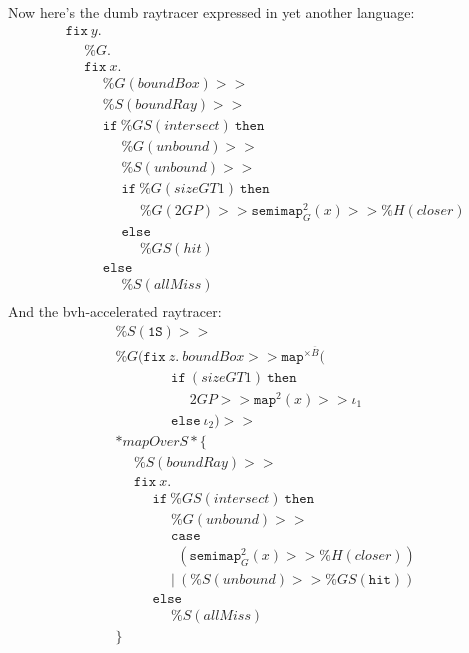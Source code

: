 \documentclass{article}
\newcommand {\fix}{\mathtt{fix}}
\newcommand {\isect}{\mathtt{hit}}
\newcommand {\oneS}{\mathtt{1S}}
\newcommand {\semimap}{\mathtt{semimap}}
\newcommand {\map}{\mathtt{map}}
\newcommand {\tab}{~~~~~~}
\begin{document}
Now here's the dumb raytracer expressed in yet another language:
\begin{align*}
&\fix~y. \\
&\tab \%G. \\
&\tab \fix~x. \\
&\tab\tab \%G(boundBox) >> \\
&\tab\tab \%S(boundRay) >> \\
&\tab\tab \mathtt{if}~\%GS(intersect)~\mathtt{then} \\
&\tab\tab\tab \%G(unbound) >> \\
&\tab\tab\tab \%S(unbound) >> \\
&\tab\tab\tab \mathtt{if}~\%G(sizeGT1)~\mathtt{then}\\
&\tab\tab\tab\tab \%G(2GP) >> \semimap_G^{2}(x) >> \%H(closer) \\
&\tab\tab\tab \mathtt{else}\\
&\tab\tab\tab\tab \%GS(hit)  \\
&\tab\tab \mathtt{else} \\
&\tab\tab\tab \%S(allMiss)\\
&
\end{align*}
And the bvh-accelerated raytracer:
\begin{align*}
&\%S (\oneS) >> \\
&\%G(\fix~z.~ boundBox >> \map^{\times \overline{B}} ( \\
&\tab\tab\tab \mathtt{if}~(sizeGT1)~\mathtt{then}\\
&\tab\tab\tab\tab 2GP >> \map^{2}(x) >> \iota_1 \\
&\tab\tab\tab \mathtt{else}~\iota_2 ) >> \\
&*mapOverS* \{ \\
&\tab \%S(boundRay) >> \\
&\tab\fix~x. \\
&\tab\tab \mathtt{if}~\%GS(intersect)~\mathtt{then} \\
&\tab\tab\tab \%G(unbound) >> \\
&\tab\tab\tab \mathtt {case} \\
&\tab\tab\tab ~~(\semimap_G^{2}(x) >> \%H(closer)) \\
&\tab\tab\tab |~(\%S(unbound)>>\%GS(\isect)) \\
&\tab\tab \mathtt{else} \\
&\tab\tab\tab \%S(allMiss)\\
&\}
\end{align*}
\end{document}
